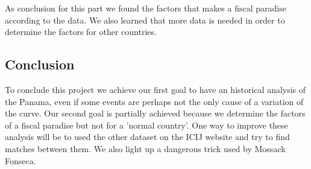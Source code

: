 \documentclass[11pt]{article}
\begin{document}
As conclusion for this part we found the factors that makes a fiscal paradise according to the data. We also learned that more data is needed in order to determine the factors for other countries. 

\subsection{Conclusion}

To conclude this project we achieve our first goal to have an historical analysis of the Panama, even if some events are perhaps not the only cause of a variation of the curve. Our second goal is partially achieved because we determine the factors of a fiscal paradise but not for a 'normal country'. One way to improve these analysis will be to used the other dataset on the ICIJ website and try to find matches between them. We also light up a dangerous trick used by Mossack Fonseca.



\end{document}
